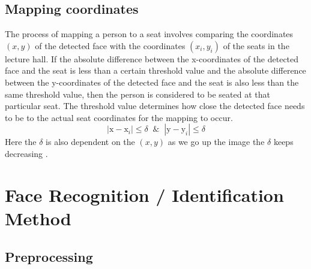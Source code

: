 \subsection{Mapping coordinates}
The process of mapping a person to a seat involves comparing the coordinates $(x,y)$ of the detected face with the coordinates $(x_i,y_i)$ of the seats in the lecture hall. If the absolute difference between the x-coordinates of the detected face and the seat is less than a certain threshold value and the absolute difference between the y-coordinates of the detected face and the seat is also less than the same threshold value, then the person is considered to be seated at that particular seat. The threshold value determines how close the detected face needs to be to the actual seat coordinates for the mapping to occur.
\newline
\begin{equation}
    |\text{x}-\text{x}_i| \leq \delta  \;\; \& \;\; |\text{y}-\text{y}_i| \leq \delta
\end{equation}
Here the $\delta$ is also dependent on the $(x,y)$ as we go up the image the $\delta$ keeps decreasing .

\clearpage
\section{Face Recognition / Identification Method}
\subsection{Preprocessing}
